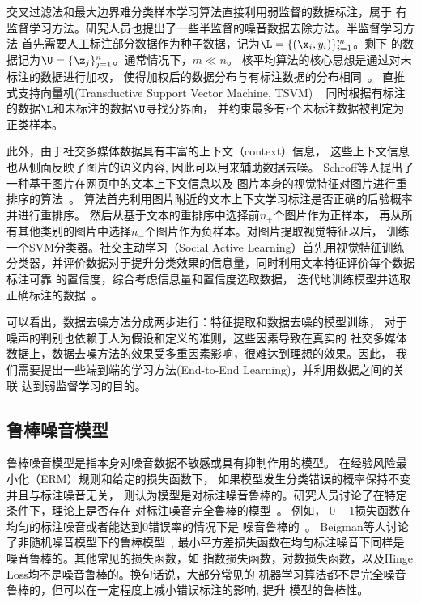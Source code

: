 交叉过滤法和最大边界难分类样本学习算法直接利用弱监督的数据标注，属于
有监督学习方法。研究人员也提出了一些半监督的噪音数据去除方法。半监督学习方法
首先需要人工标注部分数据作为种子数据，记为$\L = \{(\x_i, y_i)\}_{i=1}^m$。剩下
的数据记为$\U = \{\z_j\}_{j=1}^n$。通常情况下，$m \ll n$。
核平均算法的核心思想是通过对未标注的数据进行加权，
使得加权后的数据分布与有标注数据的分布相同~\cite{huang2006correcting,vo2015deep}。
直推式支持向量机(Transductive Support Vector Machine, TSVM)
~\cite{sindhwani2006large,vo2015deep}
同时根据有标注的数据$\L$和未标注的数据$\U$寻找分界面，
并约束最多有$r$个未标注数据被判定为正类样本。

此外，由于社交多媒体数据具有丰富的上下文（context）信息，
这些上下文信息也从侧面反映了图片的语义内容, 因此可以用来辅助数据去噪。
Schroff等人提出了一种基于图片在网页中的文本上下文信息以及
图片本身的视觉特征对图片进行重排序的算法~\cite{schroff2011harvesting}。
算法首先利用图片附近的文本上下文学习标注是否正确的后验概率并进行重排序。
然后从基于文本的重排序中选择前$n_+$个图片作为正样本，
再从所有其他类别的图片中选择$n_-$个图片作为负样本。对图片提取视觉特征以后，
训练一个SVM分类器。社交主动学习（Social Active Learning）首先用视觉特征训练
分类器，并评价数据对于提升分类效果的信息量，同时利用文本特征评价每个数据标注可靠
的置信度，综合考虑信息量和置信度选取数据，
迭代地训练模型并选取正确标注的数据~\cite{chatzilarisalic}。

可以看出，数据去噪方法分成两步进行：特征提取和数据去噪的模型训练，
对于噪声的判别也依赖于人为假设和定义的准则，这些因素导致在真实的
社交多媒体数据上，数据去噪方法的效果受多重因素影响，很难达到理想的效果。因此，
我们需要提出一些端到端的学习方法(End-to-End Learning)，并利用数据之间的关联
达到弱监督学习的目的。

\subsection{鲁棒噪音模型}
鲁棒噪音模型是指本身对噪音数据不敏感或具有抑制作用的模型。
在经验风险最小化（ERM）规则和给定的损失函数下，
如果模型发生分类错误的概率保持不变并且与标注噪音无关，
则认为模型是对标注噪音鲁棒的。研究人员讨论了在特定条件下，理论上是否存在
对标注噪音完全鲁棒的模型~\cite{manwani2013noise}。 例如，
$0-1$损失函数在均匀的标注噪音或者能达到$0$错误率的情况下是
噪音鲁棒的~\cite{thathachar2011networks,sastry2010team}。
Beigman等人讨论了非随机噪音模型下的鲁棒模型~\cite{beigman2009learning},
最小平方差损失函数在均匀标注噪音下同样是噪音鲁棒的。其他常见的损失函数，如
指数损失函数，对数损失函数，以及Hinge Loss均不是噪音鲁棒的。换句话说，大部分常见的
机器学习算法都不是完全噪音鲁棒的，但可以在一定程度上减小错误标注的影响, 提升
模型的鲁棒性。

